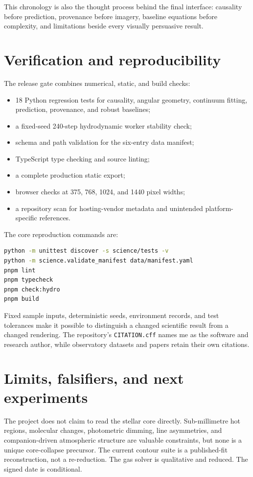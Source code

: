 \documentclass[11pt,a4paper]{article}
\begin{document}
This chronology is also the thought process behind the final interface: causality before prediction, provenance before imagery, baseline equations before complexity, and limitations beside every visually persuasive result.

\section{Verification and reproducibility}

The release gate combines numerical, static, and build checks:

\begin{itemize}
  \item 18 Python regression tests for causality, angular geometry, continuum fitting, prediction, provenance, and robust baselines;
  \item a fixed-seed 240-step hydrodynamic worker stability check;
  \item schema and path validation for the six-entry data manifest;
  \item TypeScript type checking and source linting;
  \item a complete production static export;
  \item browser checks at 375, 768, 1024, and 1440 pixel widths;
  \item a repository scan for hosting-vendor metadata and unintended platform-specific references.
\end{itemize}

The core reproduction commands are:
\begin{lstlisting}[language=bash]
python -m unittest discover -s science/tests -v
python -m science.validate_manifest data/manifest.yaml
pnpm lint
pnpm typecheck
pnpm check:hydro
pnpm build
\end{lstlisting}

Fixed sample inputs, deterministic seeds, environment records, and test tolerances make it possible to distinguish a changed scientific result from a changed rendering. The repository's \texttt{CITATION.cff} names me as the software and research author, while observatory datasets and papers retain their own citations.

\section{Limits, falsifiers, and next experiments}

The project does not claim to read the stellar core directly. Sub-millimetre hot regions, molecular changes, photometric dimming, line asymmetries, and companion-driven atmospheric structure are valuable constraints, but none is a unique core-collapse precursor. The current contour suite is a published-fit reconstruction, not a re-reduction. The gas solver is qualitative and reduced. The signed date is conditional.
\end{document}
